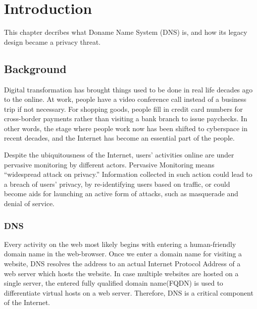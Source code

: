 \documentclass[a4paper,12pt]{article}
\begin{document}
\newpage
{}
\tableofcontents %
\newpage
{}

%
%

\section{Introduction}
This chapter decribes what Doname Name System (DNS) is, and how its legacy design became a privacy threat. 

\subsection{Background}
Digital transformation has brought things used to be done in real life decades ago to the online. At work, people have a video conference call instead of a business trip if not necessary. For shopping goods, people fill in credit card numbers for cross-border payments rather than visiting a bank branch to issue paychecks. In other words, the stage where people work now has been shifted to cyberspace in recent decades, and the Internet has become an essential part of the people.

Despite the ubiquitousness of the Internet, users' activities online are under pervasive monitoring by different actors.
Pervasive Monitoring means ``widespread attack on privacy\cite{rfc7258}.'' Information collected in such action could lead to a breach of users’ privacy, by re-identifying users based on traffic\cite{herrmann2010analyzing}, or could become aids for launching an active form of attacks, such as masquerade and denial of service.

\subsubsection{DNS}
Every activity on the web most likely begins with entering a human-friendly domain name in the web-browser. Once we enter a domain name for visiting a website, DNS resolves the address to an actual Internet Protocol Address of a web server which hosts the website. In case multiple websites are hosted on a single server, the entered fully qualified domain name(FQDN) is used to differentiate virtual hosts on a web server\cite{virtual24host}. Therefore, DNS is a critical component of the Internet.
\end{document}

